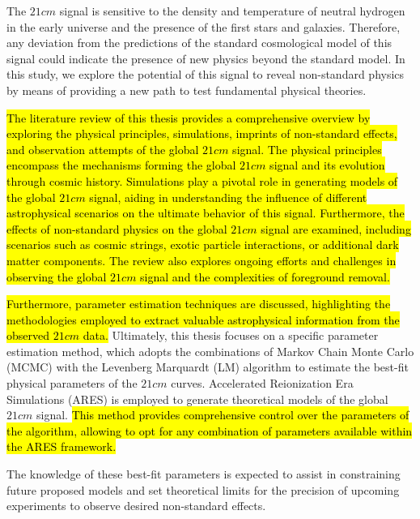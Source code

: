 \documentclass[12pt, TexShade, letterpaper]{report}
\begin{document}
The $21cm$ signal is sensitive to the density and temperature of neutral hydrogen in the early universe and the presence of the first stars and galaxies. Therefore, any deviation from the predictions of the standard cosmological model of this signal could indicate the presence of new physics beyond the standard model. In this study, we explore the potential of this signal to reveal non-standard physics by means of providing a new path to test fundamental physical theories. \par

\hl{The literature review of this thesis provides a comprehensive overview by exploring the physical principles, simulations, imprints of non-standard effects, and observation attempts of the global $21cm$ signal. The physical principles encompass the mechanisms forming the global $21cm$ signal and its evolution through cosmic history. Simulations play a pivotal role in generating models of the global $21cm$ signal, aiding in understanding the influence of different astrophysical scenarios on the ultimate behavior of this signal. Furthermore, the effects of non-standard physics on the global $21cm$ signal are examined, including scenarios such as cosmic strings, exotic particle interactions, or additional dark matter components. The review also explores ongoing efforts and challenges in observing the global $21cm$ signal and the complexities of foreground removal.}\par

\hl{Furthermore, parameter estimation techniques are discussed, highlighting the methodologies employed to extract valuable astrophysical information from the observed $21cm$ data.} Ultimately, this thesis focuses on a specific parameter estimation method, which adopts the combinations of Markov Chain Monte Carlo (MCMC) with the Levenberg Marquardt (LM) algorithm to estimate the best-fit physical parameters of the $21cm$ curves. Accelerated Reionization Era Simulations (ARES) is employed to generate theoretical models of the global $21cm$ signal. \hl{This method provides comprehensive control over the parameters of the algorithm, allowing to opt for any combination of parameters available within the ARES framework.}\par

The knowledge of these best-fit parameters is expected to assist in constraining future proposed models and set theoretical limits for the precision of upcoming experiments to observe desired non-standard effects.\par
\end{document}
